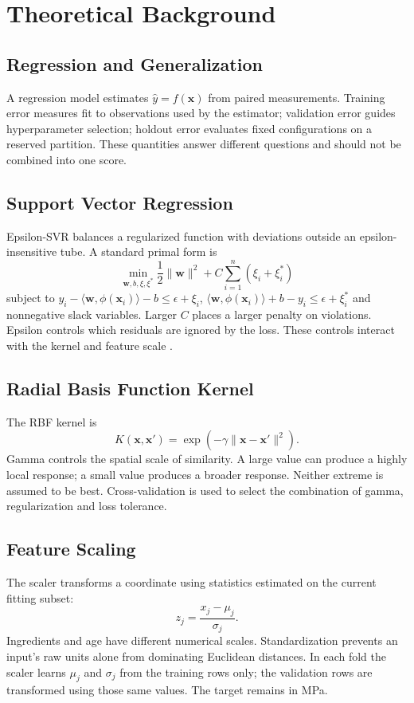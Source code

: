 \chapter{Theoretical Background}
\section{Regression and Generalization}
A regression model estimates $\hat y=f(\mathbf{x})$ from paired measurements. Training error measures fit to observations used by the estimator; validation error guides hyperparameter selection; holdout error evaluates fixed configurations on a reserved partition. These quantities answer different questions and should not be combined into one score.
\section{Support Vector Regression}
Epsilon-SVR balances a regularized function with deviations outside an epsilon-insensitive tube. A standard primal form is
\begin{equation}\min_{\mathbf{w},b,\xi,\xi^*}\frac{1}{2}\|\mathbf{w}\|^2+C\sum_{i=1}^{n}(\xi_i+\xi_i^*)\end{equation}
subject to $y_i-\langle\mathbf{w},\phi(\mathbf{x}_i)\rangle-b\leq\epsilon+\xi_i$, $\langle\mathbf{w},\phi(\mathbf{x}_i)\rangle+b-y_i\leq\epsilon+\xi_i^*$ and nonnegative slack variables. Larger $C$ places a larger penalty on violations. Epsilon controls which residuals are ignored by the loss. These controls interact with the kernel and feature scale \cite{smola,svr}.
\section{Radial Basis Function Kernel}
The RBF kernel is
\begin{equation}K(\mathbf{x},\mathbf{x}')=\exp(-\gamma\|\mathbf{x}-\mathbf{x}'\|^2).\end{equation}
Gamma controls the spatial scale of similarity. A large value can produce a highly local response; a small value produces a broader response. Neither extreme is assumed to be best. Cross-validation is used to select the combination of gamma, regularization and loss tolerance.
\section{Feature Scaling}
The scaler transforms a coordinate using statistics estimated on the current fitting subset:
\begin{equation}z_j=\frac{x_j-\mu_j}{\sigma_j}.\end{equation}
Ingredients and age have different numerical scales. Standardization prevents an input's raw units alone from dominating Euclidean distances. In each fold the scaler learns $\mu_j$ and $\sigma_j$ from the training rows only; the validation rows are transformed using those same values. The target remains in MPa.
